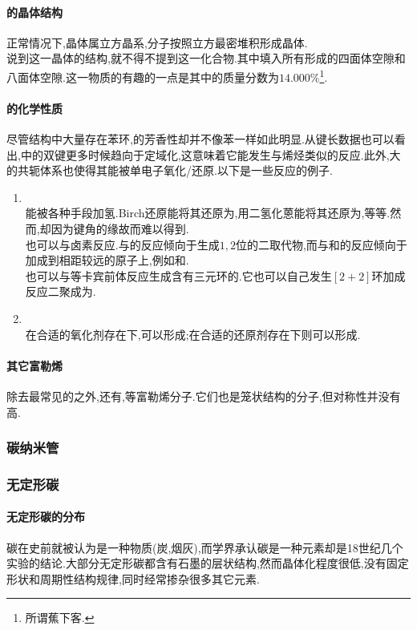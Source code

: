 \documentclass[draft]{ctexart}
\begin{document}
\paragraph{的晶体结构}
正常情况下,晶体属立方晶系,分子按照立方最密堆积形成晶体.\\
\indent 说到这一晶体的结构,就不得不提到这一化合物.其中填入所有形成的四面体空隙和八面体空隙.这一物质的有趣的一点是其中的质量分数为$14.000\%$\footnote{所谓蕉下客.}.
\paragraph{的化学性质}
尽管结构中大量存在苯环,的芳香性却并不像苯一样如此明显.从键长数据也可以看出,中的双键更多时候趋向于定域化,这意味着它能发生与烯烃类似的反应.此外,大的共轭体系也使得其能被单电子氧化/还原.以下是一些反应的例子.
\begin{enumerate}[label=\tbf{\arabic*.},topsep=0pt,parsep=0pt,itemsep=0pt,partopsep=0pt]
    \item {}\\
        能被各种手段加氢.Birch还原能将其还原为,用二氢化蒽能将其还原为,等等.然而,却因为键角的缘故而难以得到.\\
        也可以与卤素反应.与的反应倾向于生成$1,2$位的二取代物,而与和的反应倾向于加成到相距较远的原子上,例如和.\\
        也可以与等卡宾前体反应生成含有三元环的.它也可以自己发生$[2+2]$环加成反应二聚成为.
    \item {}\\
        在合适的氧化剂存在下,可以形成;在合适的还原剂存在下则可以形成.
\end{enumerate}
\paragraph{其它富勒烯}
除去最常见的之外,还有,等富勒烯分子.它们也是笼状结构的分子,但对称性并没有高.
\subsubsection{碳纳米管}
\subsubsection{无定形碳}
\paragraph{无定形碳的分布}
碳在史前就被认为是一种物质(炭,烟灰),而学界承认碳是一种元素却是18世纪几个实验的结论.大部分无定形碳都含有石墨的层状结构,然而晶体化程度很低,没有固定形状和周期性结构规律,同时经常掺杂很多其它元素.
\end{document}
